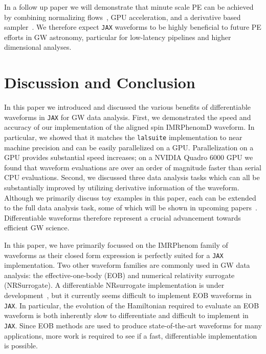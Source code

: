 \documentclass[twocolumn]{aastex631}
\newcommand{\jax}{\texttt{JAX}\xspace}
\newcommand{\lalsuite}{\texttt{lalsuite}\xspace}
\newcommand{\kw}[1]{{\color{rb4}[KW: #1 ]}}
\begin{document}
In a follow up paper we will demonstrate that minute scale PE can be achieved by combining normalizing flows~\citep{2022arXiv221106397W, Gabrie:2021tlu}, GPU acceleration, and a derivative based sampler~\citep{PEpaper}. 
We therefore expect \jax waveforms to be highly beneficial to future PE efforts in GW astronomy, particular for low-latency pipelines and higher dimensional analyses.

\section{Discussion and Conclusion}
\label{subsec:discussion}

In this paper we introduced and discussed the various benefits of differentiable waveforms in \jax for GW data analysis.
First, we demonstrated the speed and accuracy of our implementation of the aligned spin IMRPhenomD waveform.
In particular, we showed that it matches the \lalsuite implementation to near machine precision and can be easily parallelized on a GPU.
Parallelization on a GPU provides substantial speed increases; on a NVIDIA Quadro 6000 GPU we found that waveform evaluations are over an order of magnitude faster than serial CPU evaluations.
Second, we discussed three data analysis tasks which can all be substantially improved by utilizing derivative information of the waveform.
Although we primarily discuss toy examples in this paper, each can be extended to the full data analysis task, some of which will be shown in upcoming papers~\citep{PEpaper}.
Differentiable waveforms therefore represent a crucial advancement towards efficient GW science.

In this paper, we have primarily focussed on the IMRPhenom family of waveforms as their closed form expression is perfectly suited for a \jax implementation.
Two other waveform families are commonly used in GW data analysis: the effective-one-body (EOB) and numerical relativity surrogate (NRSurrogate). 
A differentiable NRsurrogate implementation is under development~\citep{NRSurAD}, but it currently seems difficult to implement EOB waveforms in \jax.
In particular, the evolution of the Hamiltonian required to evaluate an EOB waveform is both inherently slow to differentiate and difficult to implement in \jax. 
Since EOB methods are used to produce state-of-the-art waveforms for many applications, more work is required to see if a fast, differentiable implementation is possible.
\end{document}

